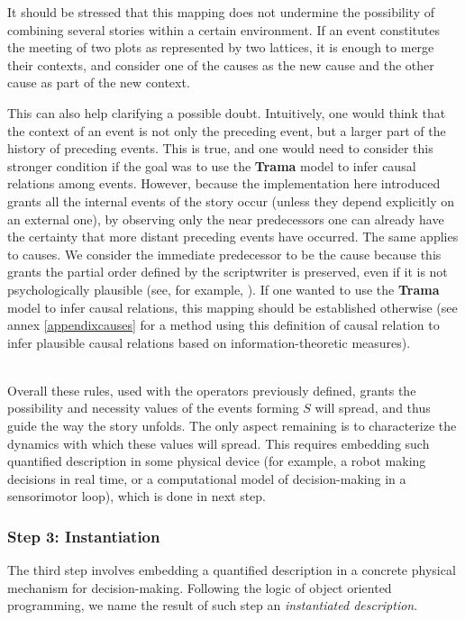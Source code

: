 \documentclass[
		twoside,openright,titlepage,numbers=noenddot,manychapters,
		headinclude,%
                footinclude=false,cleardoublepage=empty,
                BCOR=5mm,
		fontsize=11pt, %
                 enabledeprecatedfontcommands]{scrreprt}
\begin{document}
It should  be stressed that this mapping does not undermine the possibility of combining several stories within a certain environment. If an event constitutes the meeting of two plots as represented by two lattices, it is enough to merge their contexts, and consider one of the causes as the new cause and the other cause as part of the new context. 


This can also help clarifying a possible doubt. Intuitively, one would think that the context of an event is not only the preceding event, but a larger part of the history of preceding events. This is true, and one would need to consider this stronger condition if the goal was to use the \textbf{Trama} model to infer causal relations among events. However, because the implementation here introduced grants all the internal events of the story occur (unless they depend explicitly on an external one), by observing only the near predecessors one can already have the certainty that more distant preceding events have occurred. The same applies to causes. We consider the immediate predecessor to be the cause because this grants the partial order defined by the scriptwriter is preserved, even if it is not psychologically plausible (see, for example,  \cite{cheng1992cnc}). If one wanted to use the \textbf{Trama} model to infer causal relations, this mapping should be established otherwise (see annex \ref{appendixcauses} for a method using this definition of causal relation to infer plausible causal relations based on information-theoretic measures).

\ \\
Overall these rules, used with the operators previously defined, grants the possibility and necessity values of the events forming $S$ will spread, and thus guide the way the story unfolds. The only aspect remaining is to characterize the dynamics with which these values will spread. This requires embedding such quantified description in some physical device (for example, a robot making decisions in real time, or a computational model of decision-making in a sensorimotor loop), which is done in next step.

\subsubsection{Step 3: Instantiation}
\label{instan_des}

The third step involves embedding a quantified description in a concrete physical mechanism for decision-making. Following the logic of object oriented programming, we name the result of such step an \emph{instantiated description}.
\end{document}
